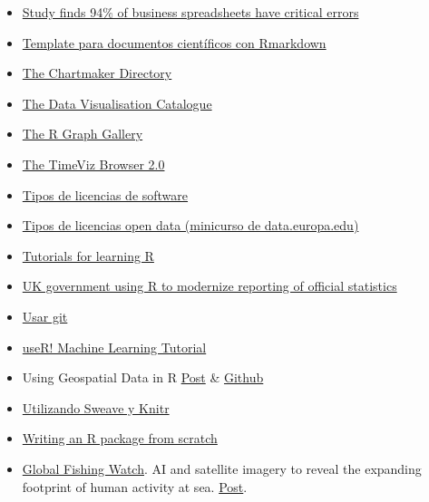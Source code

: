\documentclass[
  letterpaper,
  DIV=11,
  numbers=noendperiod]{scrartcl}
\begin{document}
\begin{itemize}
\item
  \href{https://phys.org/news/2024-08-business-spreadsheets-critical-errors.html}{Study
  finds 94\% of business spreadsheets have critical errors}
\item
  \href{http://www.petrkeil.com/?p=2401}{Template para documentos
  científicos con Rmarkdown}
\item
  \href{chartmaker.visualisingdata.com}{The Chartmaker Directory}
\item
  \href{https://datavizcatalogue.com/}{The Data Visualisation Catalogue}
\item
  \href{https://r-graph-gallery.com/}{The R Graph Gallery}
\item
  \href{https://browser.timeviz.net/}{The TimeViz Browser 2.0}
\item
  \href{https://choosealicense.com/licenses/}{Tipos de licencias de
  software}
\item
  \href{https://data.europa.eu/en/academy/open-data-licensing}{Tipos de
  licencias open data (minicurso de data.europa.edu)}
\item
  \href{https://www.r-bloggers.com/how-to-learn-r-2/}{Tutorials for
  learning R}
\item
  \href{https://www.r-bloggers.com/uk-government-using-r-to-modernize-reporting-of-official-statistics/}{UK
  government using R to modernize reporting of official statistics}
\item
  \href{https://try.github.io/levels/1/challenges/1}{Usar git}
\item
  \href{https://github.com/ledell/useR-machine-learning-tutorial}{useR!
  Machine Learning Tutorial}
\item
  Using Geospatial Data in R
  \href{https://www.r-bloggers.com/2021/06/using-geospatial-data-in-r/}{Post}
  \&
  \href{https://github.com/SocialScienceDataLab/MZES_SSDL_Georeferenced_Survey_Data}{Github}
\item
  \href{https://support.posit.co/hc/en-us/articles/200552056-Using-Sweave-and-knitr}{Utilizando
  Sweave y Knitr}
\item
  \href{https://hilaryparker.com/2014/04/29/writing-an-r-package-from-scratch/}{Writing
  an R package from scratch}
\item
  \href{https://globalfishingwatch.org/}{Global Fishing Watch}. AI and
  satellite imagery to reveal the expanding footprint of human activity
  at sea.
  \href{https://globalfishingwatch.org/press-release/new-research-harnesses-ai-and-satellite-imagery-to-reveal-the-expanding-footprint-of-human-activity-at-sea/?utm_source=GFW+subscribers&utm_campaign=9363c93195-EMAIL_CAMPAIGN_JAN_2024_CURRENT_ENGLISH&utm_medium=email&utm_term=0_-9363c93195-\%5BLIST_EMAIL_ID\%5D}{Post}.

\end{itemize}
\end{document}
